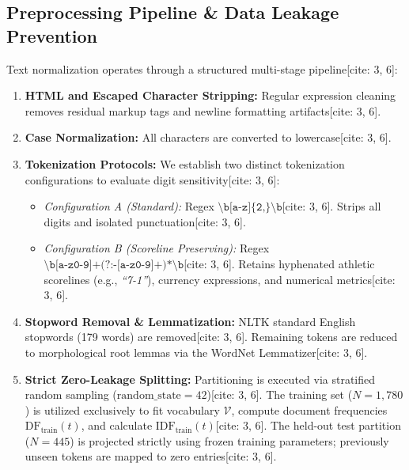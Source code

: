 \documentclass[11pt,a4paper]{article}
\begin{document}
	\subsection{Preprocessing Pipeline \& Data Leakage Prevention}
	Text normalization operates through a structured multi-stage pipeline[cite: 3, 6]:
	\begin{enumerate}[leftmargin=1.5em, itemsep=0.2em]
		\item \textbf{HTML and Escaped Character Stripping:} Regular expression cleaning removes residual markup tags and newline formatting artifacts[cite: 3, 6].
		\item \textbf{Case Normalization:} All characters are converted to lowercase[cite: 3, 6].
		\item \textbf{Tokenization Protocols:} We establish two distinct tokenization configurations to evaluate digit sensitivity[cite: 3, 6]:
		\begin{itemize}
			\item \textit{Configuration A (Standard):} Regex $\texttt{\textbackslash b[a-z]\{2,\}\textbackslash b}$[cite: 3, 6]. Strips all digits and isolated punctuation[cite: 3, 6].
			\item \textit{Configuration B (Scoreline Preserving):} Regex $\texttt{\textbackslash b[a-z0-9]+(?:-[a-z0-9]+)*\textbackslash b}$[cite: 3, 6]. Retains hyphenated athletic scorelines (e.g., \textit{``7-1''}), currency expressions, and numerical metrics[cite: 3, 6].
		\end{itemize}
		\item \textbf{Stopword Removal \& Lemmatization:} NLTK standard English stopwords (179 words) are removed[cite: 3, 6]. Remaining tokens are reduced to morphological root lemmas via the WordNet Lemmatizer[cite: 3, 6].
		\item \textbf{Strict Zero-Leakage Splitting:} Partitioning is executed via stratified random sampling ($\text{random\_state}=42$)[cite: 3, 6]. The training set ($N=1,780$) is utilized exclusively to fit vocabulary $\mathcal{V}$, compute document frequencies $\text{DF}_{\text{train}}(t)$, and calculate $\text{IDF}_{\text{train}}(t)$[cite: 3, 6]. The held-out test partition ($N=445$) is projected strictly using frozen training parameters; previously unseen tokens are mapped to zero entries[cite: 3, 6].
	\end{enumerate}
	
\end{document}
